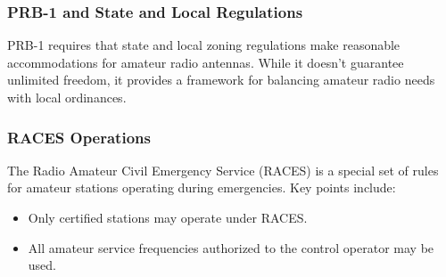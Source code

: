 \subsubsection*{PRB-1 and State and Local Regulations}
PRB-1 requires that state and local zoning regulations make reasonable accommodations for amateur radio antennas. While it doesn’t guarantee unlimited freedom, it provides a framework for balancing amateur radio needs with local ordinances.

\subsubsection*{RACES Operations}
The Radio Amateur Civil Emergency Service (RACES) is a special set of rules for amateur stations operating during emergencies. Key points include:
\begin{itemize}
    \item Only certified stations may operate under RACES.
    \item All amateur service frequencies authorized to the control operator may be used.
\end{itemize}

